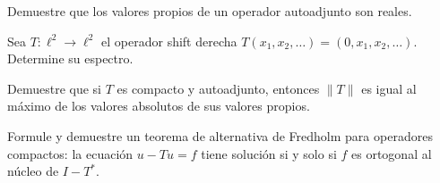 \begin{exercise}
Demuestre que los valores propios de un operador autoadjunto son reales.
\end{exercise}

\begin{exercise}
Sea $T\colon\ell^2\to\ell^2$ el operador shift derecha $T(x_1,x_2,\dots)=(0,x_1,x_2,\dots)$. Determine su espectro.
\end{exercise}

\begin{exercise}
Demuestre que si $T$ es compacto y autoadjunto, entonces $\|T\|$ es igual al máximo de los valores absolutos de sus valores propios.
\end{exercise}

\begin{problem}
Formule y demuestre un teorema de alternativa de Fredholm para operadores compactos: la ecuación $u-Tu=f$ tiene solución si y solo si $f$ es ortogonal al núcleo de $I-T^*$.
\end{problem}
